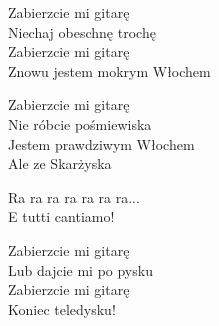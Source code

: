 \begin{text}
Zabierzcie mi gitarę\\
Niechaj obeschnę trochę\\
Zabierzcie mi gitarę\\
Znowu jestem mokrym Włochem

Zabierzcie mi gitarę\\
Nie róbcie pośmiewiska\\
Jestem prawdziwym Włochem\\
Ale ze Skarżyska

Ra ra ra ra ra ra ra...\\
E tutti cantiamo!

Zabierzcie mi gitarę\\
Lub dajcie mi po pysku\\
Zabierzcie mi gitarę\\
Koniec teledysku!
\end{text}
\begin{chord}
\end{chord}

